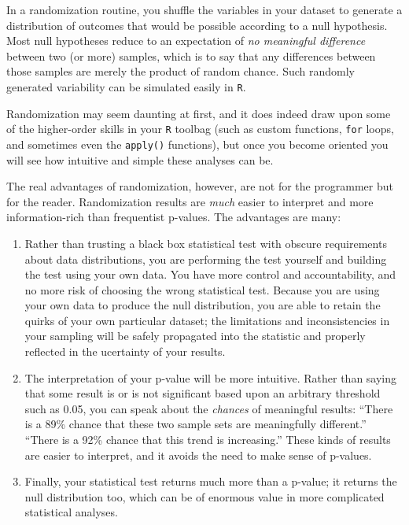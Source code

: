 \documentclass[
]{book}
\begin{document}
In a randomization routine, you shuffle the variables in your dataset to generate a distribution of outcomes that would be possible according to a null hypothesis. Most null hypotheses reduce to an expectation of \emph{no meaningful difference} between two (or more) samples, which is to say that any differences between those samples are merely the product of random chance. Such randomly generated variability can be simulated easily in \texttt{R}.

Randomization may seem daunting at first, and it does indeed draw upon some of the higher-order skills in your \texttt{R} toolbag (such as custom functions, \texttt{for} loops, and sometimes even the \texttt{apply()} functions), but once you become oriented you will see how intuitive and simple these analyses can be.

The real advantages of randomization, however, are not for the programmer but for the reader. Randomization results are \emph{much} easier to interpret and more information-rich than frequentist p-values. The advantages are many:

\begin{enumerate}
\def\labelenumi{\arabic{enumi}.}
\item
  Rather than trusting a black box statistical test with obscure requirements about data distributions, you are performing the test yourself and building the test using your own data. You have more control and accountability, and no more risk of choosing the wrong statistical test. Because you are using your own data to produce the null distribution, you are able to retain the quirks of your own particular dataset; the limitations and inconsistencies in your sampling will be safely propagated into the statistic and properly reflected in the ucertainty of your results.
\item
  The interpretation of your p-value will be more intuitive. Rather than saying that some result is or is not significant based upon an arbitrary threshold such as 0.05, you can speak about the \emph{chances} of meaningful results: ``There is a 89\% chance that these two sample sets are meaningfully different.'' ``There is a 92\% chance that this trend is increasing.'' These kinds of results are easier to interpret, and it avoids the need to make sense of p-values.
\item
  Finally, your statistical test returns much more than a p-value; it returns the null distribution too, which can be of enormous value in more complicated statistical analyses.
\end{enumerate}
\end{document}
